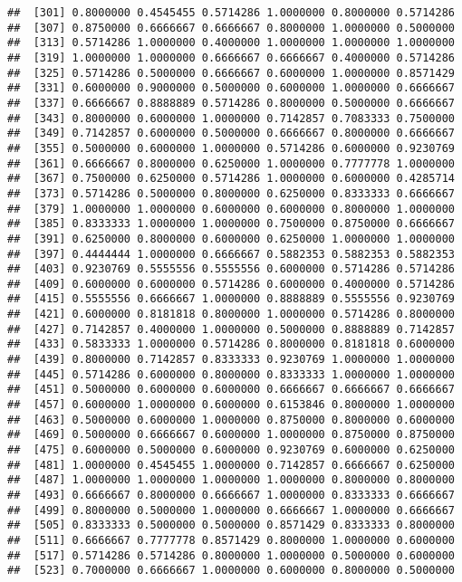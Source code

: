 \documentclass[]{article}
\begin{document}
\begin{verbatim}
##  [301] 0.8000000 0.4545455 0.5714286 1.0000000 0.8000000 0.5714286
##  [307] 0.8750000 0.6666667 0.6666667 0.8000000 1.0000000 0.5000000
##  [313] 0.5714286 1.0000000 0.4000000 1.0000000 1.0000000 1.0000000
##  [319] 1.0000000 1.0000000 0.6666667 0.6666667 0.4000000 0.5714286
##  [325] 0.5714286 0.5000000 0.6666667 0.6000000 1.0000000 0.8571429
##  [331] 0.6000000 0.9000000 0.5000000 0.6000000 1.0000000 0.6666667
##  [337] 0.6666667 0.8888889 0.5714286 0.8000000 0.5000000 0.6666667
##  [343] 0.8000000 0.6000000 1.0000000 0.7142857 0.7083333 0.7500000
##  [349] 0.7142857 0.6000000 0.5000000 0.6666667 0.8000000 0.6666667
##  [355] 0.5000000 0.6000000 1.0000000 0.5714286 0.6000000 0.9230769
##  [361] 0.6666667 0.8000000 0.6250000 1.0000000 0.7777778 1.0000000
##  [367] 0.7500000 0.6250000 0.5714286 1.0000000 0.6000000 0.4285714
##  [373] 0.5714286 0.5000000 0.8000000 0.6250000 0.8333333 0.6666667
##  [379] 1.0000000 1.0000000 0.6000000 0.6000000 0.8000000 1.0000000
##  [385] 0.8333333 1.0000000 1.0000000 0.7500000 0.8750000 0.6666667
##  [391] 0.6250000 0.8000000 0.6000000 0.6250000 1.0000000 1.0000000
##  [397] 0.4444444 1.0000000 0.6666667 0.5882353 0.5882353 0.5882353
##  [403] 0.9230769 0.5555556 0.5555556 0.6000000 0.5714286 0.5714286
##  [409] 0.6000000 0.6000000 0.5714286 0.6000000 0.4000000 0.5714286
##  [415] 0.5555556 0.6666667 1.0000000 0.8888889 0.5555556 0.9230769
##  [421] 0.6000000 0.8181818 0.8000000 1.0000000 0.5714286 0.8000000
##  [427] 0.7142857 0.4000000 1.0000000 0.5000000 0.8888889 0.7142857
##  [433] 0.5833333 1.0000000 0.5714286 0.8000000 0.8181818 0.6000000
##  [439] 0.8000000 0.7142857 0.8333333 0.9230769 1.0000000 1.0000000
##  [445] 0.5714286 0.6000000 0.8000000 0.8333333 1.0000000 1.0000000
##  [451] 0.5000000 0.6000000 0.6000000 0.6666667 0.6666667 0.6666667
##  [457] 0.6000000 1.0000000 0.6000000 0.6153846 0.8000000 1.0000000
##  [463] 0.5000000 0.6000000 1.0000000 0.8750000 0.8000000 0.6000000
##  [469] 0.5000000 0.6666667 0.6000000 1.0000000 0.8750000 0.8750000
##  [475] 0.6000000 0.5000000 0.6000000 0.9230769 0.6000000 0.6250000
##  [481] 1.0000000 0.4545455 1.0000000 0.7142857 0.6666667 0.6250000
##  [487] 1.0000000 1.0000000 1.0000000 1.0000000 0.8000000 0.8000000
##  [493] 0.6666667 0.8000000 0.6666667 1.0000000 0.8333333 0.6666667
##  [499] 0.8000000 0.5000000 1.0000000 0.6666667 1.0000000 0.6666667
##  [505] 0.8333333 0.5000000 0.5000000 0.8571429 0.8333333 0.8000000
##  [511] 0.6666667 0.7777778 0.8571429 0.8000000 1.0000000 0.6000000
##  [517] 0.5714286 0.5714286 0.8000000 1.0000000 0.5000000 0.6000000
##  [523] 0.7000000 0.6666667 1.0000000 0.6000000 0.8000000 0.5000000

\end{verbatim}
\end{document}
